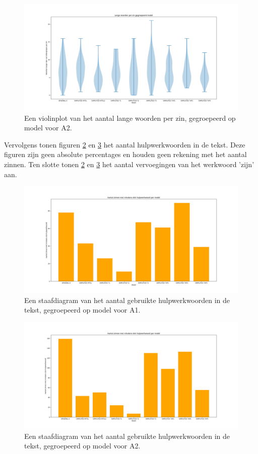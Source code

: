 \begin{figure}[H]
	\includegraphics[width=\linewidth]{img/violinplot-long-a2.png}
	\caption{Een violinplot van het aantal lange woorden per zin, gegroepeerd op model voor A2.}
	\label{img:violinplot-long-a2}
\end{figure}

Vervolgens tonen figuren \ref{img:histplot-aux-a1} en \ref{img:histplot-aux-a2} het aantal hulpwerkwoorden in de tekst. Deze figuren zijn geen absolute percentages en houden geen rekening met het aantal zinnen. Ten slotte tonen \ref{img:histplot-aux-a1} en \ref{img:histplot-aux-a2} het aantal vervoegingen van het werkwoord 'zijn' aan. 

\begin{figure}[H]
	\includegraphics[width=\linewidth]{img/boxplot-aux-a1.png}
	\caption{Een staafdiagram van het aantal gebruikte hulpwerkwoorden in de tekst, gegroepeerd op model voor A1.}
	\label{img:histplot-aux-a1}
\end{figure}

\begin{figure}[H]
	\includegraphics[width=\linewidth]{img/boxplot-aux-a2.png}
	\caption{Een staafdiagram van het aantal gebruikte hulpwerkwoorden in de tekst, gegroepeerd op model voor A2.}
	\label{img:histplot-aux-a2}
\end{figure}

